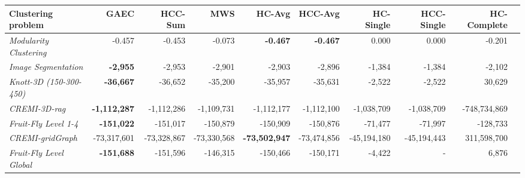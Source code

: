 \begin{table}[t]
    \centering
    \scriptsize
    \begin{subtable}[t!]{\textwidth}
    \centering

        \begin{tabular}{l | r r r r r r r r r}
        Clustering problem & \multicolumn{1}{r}{GAEC \cite{keuper2015efficient}} & HCC-Sum & MWS \cite{wolf2018mutex} & HC-Avg & HCC-Avg & HC-Single & HCC-Single & HC-Complete \\ \midrule
        \emph{Modularity Clustering} & 
        -0.457 & -0.453 & -0.073 & \textbf{-0.467} & \textbf{-0.467} & 0.000 & 0.000 & -0.201 \\ 
        \emph{Image Segmentation}  & 
        \textbf{-2,955} & -2,953 & -2,901 & -2,903 & -2,896 & -1,384 & -1,384 & -2,102 \\
        \emph{Knott-3D (150-300-450)}  & 
        \textbf{-36,667} & -36,652 & -35,200 & -35,957 & -35,631 & -2,522 & -2,522 & 30,629 \\
        \emph{CREMI-3D-rag}  
        & \textbf{-1,112,287} & -1,112,286& -1,109,731 & -1,112,177 & -1,112,100 & -1,038,709 & -1,038,709 & -748,734,869 \\ 
        \emph{Fruit-Fly Level 1-4}
        & \textbf{-151,022} & -151,017 & -150,879 & -150,909 & -150,876 & -71,477 & -71,997 & -128,733 \\
        \emph{CREMI-gridGraph} 
        & -73,317,601 & -73,328,867 & -73,330,568 & \textbf{-73,502,947} & -73,474,856 & -45,194,180 &-45,194,443 & 311,598,700 \\
        \emph{Fruit-Fly Level Global} 
        & \textbf{-151,688} & -151,596 & -146,315 & -150,466 & -150,171 & -4,422 & - & 6,876 \\


\end{tabular}
\end{subtable}
\end{table}
